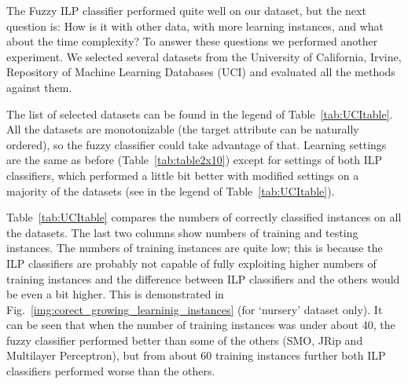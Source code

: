The Fuzzy ILP classifier performed quite well on our dataset, but the next question is: How is it with other data, with more learning instances, and what about the time complexity? To answer these questions we performed another experiment. We selected several datasets from the University of California, Irvine, Repository of Machine Learning Databases (UCI) \citep{biblio:UCI} and evaluated all the methods against them. 



The list of selected datasets can be found in the legend of Table~\ref{tab:UCItable}. All the datasets are monotonizable (the target attribute can be naturally ordered), so the fuzzy classifier could take advantage of that. Learning settings are the same as before (Table~\ref{tab:table2x10}) except for settings of both ILP classifiers, which  performed a little bit better with modified settings on a majority of the datasets (see in the legend of Table~\ref{tab:UCItable}). 

Table~\ref{tab:UCItable} compares the numbers of correctly classified instances on all the datasets. The last two columns show numbers of training and testing instances. The numbers of training instances are quite low; this is because the ILP classifiers are probably not capable of fully exploiting higher numbers of training instances and the difference between ILP classifiers and the others would be even a bit higher. This is demonstrated in Fig.~\ref{img:corect_growing_learninig_instances} (for `nursery' dataset only). It can be seen that when the number of training instances was under about 40, the fuzzy classifier performed better than some of the others (SMO, JRip and Multilayer Perceptron), but from about 60 training instances further both ILP classifiers performed worse than the others.


